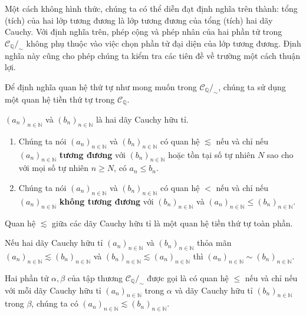 Một cách không hình thức, chúng ta có thể diễn đạt định nghĩa trên thành: tổng (tích) của hai lớp tương đương là lớp tương đương của tổng (tích) hai dãy Cauchy. Với định nghĩa trên, phép cộng và phép nhân của hai phần tử trong $\mathscr{C}_{\mathbb{Q}}/_{\sim}$ không phụ thuộc vào việc chọn phần tử đại diện của lớp tương đương. Định nghĩa này cũng cho phép chúng ta kiểm tra các tiên đề về trường một cách thuận lợi.

Để định nghĩa quan hệ thứ tự như mong muốn trong $\mathscr{C}_{\mathbb{Q}}/_{\sim}$, chúng ta sử dụng một quan hệ tiền thứ tự trong $\mathscr{C}_{\mathbb{Q}}$.

\begin{definition}
    ${(a_{n})}_{n\in\mathbb{N}}$ và ${(b_{n})}_{n\in\mathbb{N}}$ là hai dãy Cauchy hữu tỉ.
    \begin{enumerate}[label={(\roman*)}]
        \item Chúng ta nói ${(a_{n})}_{n\in\mathbb{N}}$ và ${(b_{n})}_{n\in\mathbb{N}}$ có quan hệ $\lesssim$ nếu và chỉ nếu ${(a_{n})}_{n\in\mathbb{N}}$ \textbf{tương đương} với ${(b_{n})}_{n\in\mathbb{N}}$ hoặc tồn tại số tự nhiên $N$ sao cho với mọi số tự nhiên $n\geq N$, có $a_{n}\leq b_{n}$.
        \item Chúng ta nói ${(a_{n})}_{n\in\mathbb{N}}$ và ${(b_{n})}_{n\in\mathbb{N}}$ có quan hệ $<$ nếu và chỉ nếu ${(a_{n})}_{n\in\mathbb{N}}$ \textbf{không tương đương} với ${(b_{n})}_{n\in\mathbb{N}}$ và ${(a_{n})}_{n\in\mathbb{N}}\leq {(b_{n})}_{n\in\mathbb{N}}$.
    \end{enumerate}
\end{definition}

\begin{theorem}
    Quan hệ $\lesssim$ giữa các dãy Cauchy hữu tỉ là một quan hệ tiền thứ tự toàn phần.
\end{theorem}

\begin{theorem}\label{theorem:preorder-and-equivalence-relation-between-rational-cauchy-sequences}
    Nếu hai dãy Cauchy hữu tỉ ${(a_{n})}_{n\in\mathbb{N}}$ và ${(b_{n})}_{n\in\mathbb{N}}$ thỏa mãn ${(a_{n})}_{n\in\mathbb{N}}\lesssim {(b_{n})}_{n\in\mathbb{N}}$ và ${(b_{n})}_{n\in\mathbb{N}}\lesssim {(a_{n})}_{n\in\mathbb{N}}$ thì ${(a_{n})}_{n\in\mathbb{N}}\sim {(b_{n})}_{n\in\mathbb{N}}$.
\end{theorem}

\begin{definition}
    Hai phần tử $\alpha, \beta$ của tập thương $\mathscr{C}_{\mathbb{Q}}/_{\sim}$ được gọi là có quan hệ $\leq$ nếu và chỉ nếu với mỗi dãy Cauchy hữu tỉ ${(a_{n})}_{n\in\mathbb{N}}$ trong $\alpha$ và dãy Cauchy hữu tỉ ${(b_{n})}_{n\in\mathbb{N}}$ trong $\beta$, chúng ta có ${(a_{n})}_{n\in\mathbb{N}}\lesssim {(b_{n})}_{n\in\mathbb{N}}$.
\end{definition}

